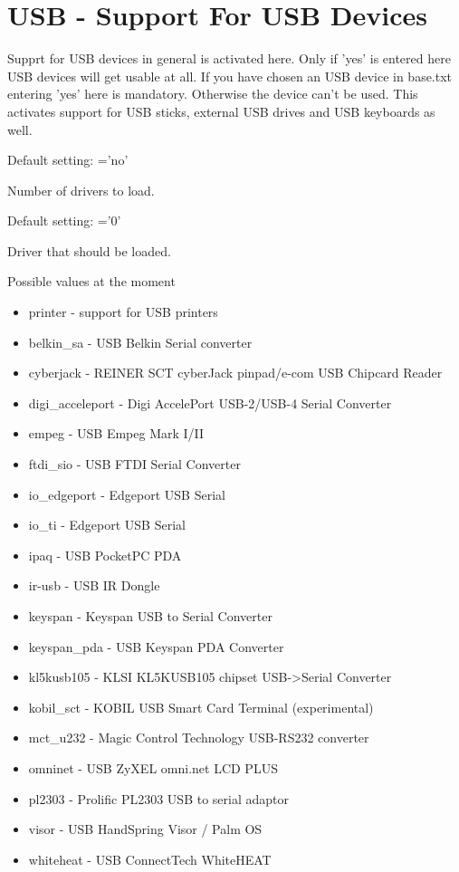 {
\section {USB - Support For USB Devices}
}
\begin{description}


        Supprt for USB devices in general is activated here. Only if 'yes' 
        is entered here USB devices will get usable at all. If you have 
        chosen an USB device in base.txt entering 'yes' here is mandatory. 
        Otherwise the device can't be used. This activates support for USB sticks,
        external USB drives and USB keyboards as well.

        Default setting:  ='no'


        Number of drivers to load. 

        Default setting: ='0'


        Driver that should be loaded.

        Possible values at the moment
        \begin{itemize}
	    \item printer - support for USB printers
	    \item belkin\_sa - USB Belkin Serial converter
	    \item cyberjack - REINER SCT cyberJack pinpad/e-com USB Chipcard Reader
	    \item digi\_acceleport - Digi AccelePort USB-2/USB-4 Serial Converter
	    \item empeg - USB Empeg Mark I/II
	    \item ftdi\_sio - USB FTDI Serial Converter
	    \item io\_edgeport - Edgeport USB Serial
	    \item io\_ti - Edgeport USB Serial
	    \item ipaq - USB PocketPC PDA
	    \item ir-usb - USB IR Dongle
	    \item keyspan - Keyspan USB to Serial Converter
	    \item keyspan\_pda - USB Keyspan PDA Converter
	    \item kl5kusb105 - KLSI KL5KUSB105 chipset USB->Serial Converter
	    \item kobil\_sct - KOBIL USB Smart Card Terminal (experimental)
	    \item mct\_u232 - Magic Control Technology USB-RS232 converter
	    \item omninet - USB ZyXEL omni.net LCD PLUS
	    \item pl2303 - Prolific PL2303 USB to serial adaptor
	    \item visor - USB HandSpring Visor / Palm OS
	    \item whiteheat - USB ConnectTech WhiteHEAT
        \end{itemize}


\end{description}
